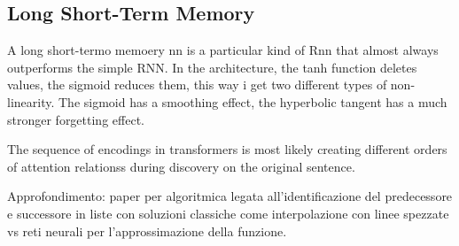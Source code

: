 \subsection*{Long Short-Term Memory}
A long short-termo memoery nn is a particular kind of Rnn that almost always outperforms the simple RNN. In the architecture, the tanh function deletes values, the sigmoid reduces them, this way i get two different types of non-linearity. The sigmoid has a smoothing effect, the hyperbolic tangent has a much stronger forgetting effect.

The sequence of encodings in transformers is most likely creating different orders of attention relationss during discovery on the original sentence.


Approfondimento: paper per algoritmica legata all'identificazione del predecessore e successore in liste con soluzioni classiche come interpolazione con linee spezzate vs reti neurali per l'approssimazione della funzione. 

